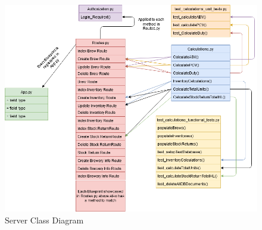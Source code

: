 \begin{figure}[h!]
 	\caption{Server Class Diagram}
	\label{image:serverdiagram}
 	\centering
 	\includegraphics[width=1\textwidth]{Images/Server Class Diagram.png}
\end{figure}
\clearpage

